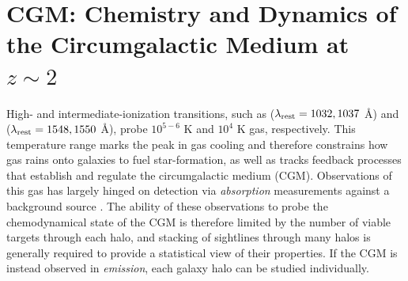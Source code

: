 \documentclass[11pt,a4paper,twoside,onecolumn,openany,final,oldfontcommands]{memoir}
\begin{document}



\section{CGM: Chemistry and Dynamics of the Circumgalactic Medium at $z\sim2$}

High- and intermediate-ionization transitions, such as  ($\lambda_{\rm rest} = 1032, 1037$ \AA) and  ($\lambda_{\rm rest} = 1548, 1550$ \AA), probe $10^{5-6}$ K and $10^4$ K gas, respectively.  This temperature range marks the peak in gas cooling and therefore constrains how gas rains onto galaxies to fuel star-formation, as well as tracks feedback processes that establish and regulate the circumgalactic medium (CGM).  Observations of this gas has largely hinged on detection via \textit{absorption} measurements against a background source \citep{Bahcall:1969qy,tumlinson17}.  The ability of these observations to probe the chemodynamical state of the CGM is therefore limited by the number of viable targets through each halo, and stacking of sightlines through many halos is generally required to provide a statistical view of their properties.  If the CGM is instead observed in \textit{emission}, each galaxy halo can be studied individually.
\end{document}
